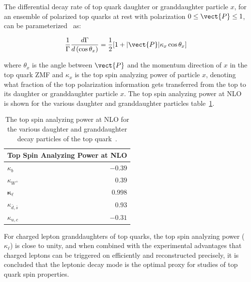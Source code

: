 The differential decay rate of top quark daughter or granddaughter particle $x$, for an ensemble of polarized top quarks at rest with polarization $0 \leq \vect{P} \leq 1$, can be parameterized~\cite{BRANDENBURG2002235} as:
\begin{linenomath*}
\begin{align}
\frac{1}{\Gamma} \frac{d \Gamma}{d\left(\cos \theta_x\right)}=\frac{1}{2}[1+ \vert \vect{P} \vert \kappa_x \cos \theta_x]
\end{align}
\end{linenomath*}
where $\theta_x$ is the angle between $\vect{P}$ and the momentum direction of $x$ in the top quark ZMF and $\kappa_x$ is the top spin analyzing power of particle $x$, denoting what fraction of the top polarization information gets transferred from the top to its daughter or granddaughter particle $x$.
The top spin analyzing power at NLO is shown for the various daughter and granddaughter particles table~\ref{spin_analyzing_power_NLO}.
\begin{table}[htb]
\begin{center}
\begin{tabular}{lr}
\multicolumn{2}{c}{ Top Spin Analyzing Power at NLO } \\
\hline$\kappa_b$ & $-0.39$ \\
$\kappa_{W^{+}}$ & $0.39$ \\
$\boldsymbol{\kappa}_{\ell}$ & $\mathbf{0.998}$ \\
$\kappa_{\bar{d}, \bar{s}}$ & $0.93$ \\
$\kappa_{u, c}$ & $-0.31$
\end{tabular}
\caption{The top spin analyzing power at NLO for the various daughter and granddaughter decay particles of the top quark~\cite{BRANDENBURG2002235}.
         }
\label{spin_analyzing_power_NLO}
\end{center}
\end{table}
For charged lepton granddaughters of top quarks, the top spin analyzing power ($\kappa_\ell$) is close to unity, and when combined with the experimental advantages that charged leptons can be triggered on efficiently and reconstructed precisely, it is concluded that the leptonic decay mode is the optimal proxy for studies of top quark spin properties.

